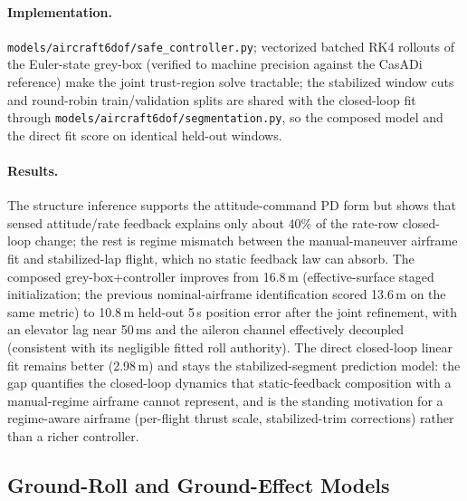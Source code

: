 \documentclass[11pt]{article}
\begin{document}
\paragraph{Implementation.}
\texttt{models/aircraft6dof/safe\_controller.py}; vectorized batched RK4
rollouts of the Euler-state grey-box (verified to machine precision against
the CasADi reference) make the joint trust-region solve tractable; the
stabilized window cuts and round-robin train/validation splits are shared
with the closed-loop fit through
\texttt{models/aircraft6dof/segmentation.py}, so the composed model and the
direct fit score on identical held-out windows.
\paragraph{Results.} The structure inference supports the attitude-command
PD form but shows that sensed attitude/rate feedback explains only about
40\% of the rate-row closed-loop change; the rest is regime mismatch
between the manual-maneuver airframe fit and stabilized-lap flight, which
no static feedback law can absorb. The composed grey-box+controller
improves from 16.8\,m (effective-surface staged initialization; the
previous nominal-airframe identification scored 13.6\,m on the same
metric) to 10.8\,m held-out 5\,s position error after the joint
refinement, with an elevator lag near 50\,ms and the aileron channel
effectively decoupled (consistent with its negligible fitted roll
authority). The direct closed-loop linear fit remains better (2.98\,m) and
stays the stabilized-segment prediction model: the gap quantifies the
closed-loop dynamics that static-feedback composition with a
manual-regime airframe cannot represent, and is the standing motivation
for a regime-aware airframe (per-flight thrust scale, stabilized-trim
corrections) rather than a richer controller.

\subsection{Ground-Roll and Ground-Effect Models}
\end{document}
